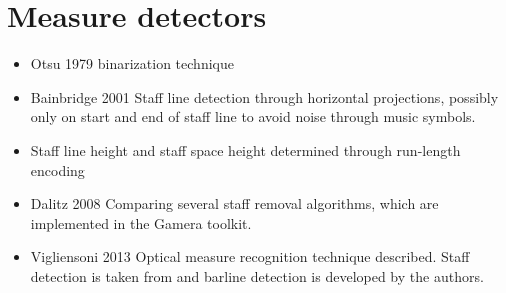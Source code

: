 \section{Measure detectors}
\begin{itemize}
    \item Otsu 1979 \citep{Otsu1979} binarization technique

    \item Bainbridge 2001 \citep{Bainbridge2001} Staff line detection through horizontal projections, possibly only on start and end of staff line to avoid noise through music symbols.

    \item Staff line height and staff space height determined through run-length encoding \citep{Rebelo2012}

    \item Dalitz 2008 \citep{Dalitz2008} Comparing several staff removal algorithms, which are implemented in the Gamera toolkit.

    \item Vigliensoni 2013 \citep{Vigliensoni2013} Optical measure recognition technique described. Staff detection is taken from \citep{} and barline detection is developed by the authors.
\end{itemize}

